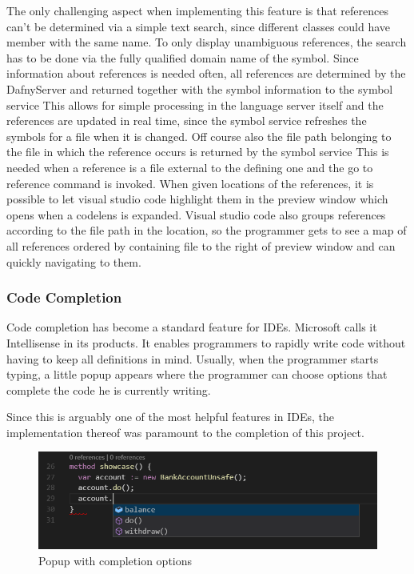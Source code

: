 The only challenging aspect when implementing this feature is that references can't be determined via a simple text search, since different classes could have member with the same name. To only display unambiguous references, the search has to be done via the fully qualified domain name of the symbol. Since information about references is needed often, all references are determined by the DafnyServer and returned together with the symbol information to the symbol service This allows for simple processing in the language server itself and the references are updated in real time, since the symbol service refreshes the symbols for a file when it is changed. Off course also the file path belonging to the file in which the reference occurs is returned by the symbol service This is needed when a reference is a file external to the defining one and the go to reference command is invoked.\newline
When given locations of the references, it is possible to let visual studio code highlight them in the preview window which opens when a codelens is expanded. Visual studio code also groups references according to the file path in the location, so the programmer gets to see a map of all references ordered by containing file to the right of preview window and can quickly navigating to them.

 \subsubsection{Code Completion} \label{codecompletion}
 Code completion has become a standard feature for IDEs. Microsoft calls it Intellisense in its products. It enables programmers to rapidly write code without having to keep all definitions in mind. Usually, when the programmer starts typing, a little popup appears where the programmer can choose options that complete the code he is currently writing. \newline
 
 Since this is arguably one of the most helpful features in IDEs, the implementation thereof was paramount to the completion of this project. \newline
 
 \begin{figure}[H]
 	\centering
 	\includegraphics[width=1\textwidth]{img/codeCompletionOverview}
 	\caption{Popup with completion options}
 	\label{fig:codecompletionoverview}
 \end{figure}
 
